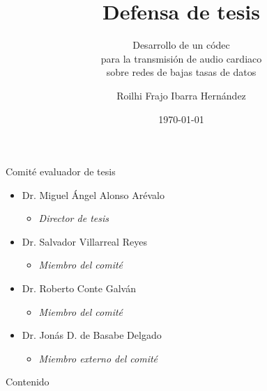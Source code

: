 \documentclass[xcolor=table]{beamer}
\title{Defensa de tesis}
\subtitle{Desarrollo de un c\'{o}dec \\para la transmisi\'{o}n de audio cardiaco\\ sobre redes de bajas tasas de datos}
\date{\today}
\author{Roilhi Frajo Ibarra Hern\'{a}ndez}
\institute{Departamento de Electr\'{o}nica y Telecomunicaciones\\Divisi\'{o}n de F\'{i}sica Aplicada}
\begin{document}

\beamertemplatenavigationsymbolsempty
\begin{frame}[plain]
	\titlepage
\end{frame}
\begin{frame}{Comit\'e evaluador de tesis}
\begin{itemize}
	\item Dr. Miguel \'Angel Alonso Ar\'evalo
		\begin{itemize}
			\item \emph{Director de tesis}
		\end{itemize}
	\item Dr. Salvador Villarreal Reyes
		\begin{itemize}
			\item \emph{Miembro del comit\'e}
		\end{itemize}	
	\item Dr. Roberto Conte Galv\'an
		\begin{itemize}
			\item \emph{Miembro del comit\'e}
		\end{itemize}
	\item Dr. Jon\'as D. de Basabe Delgado
		\begin{itemize}
			\item \emph{Miembro externo del comit\'e}
		\end{itemize}
\end{itemize}
\end{frame}


\begin{frame}{Contenido}
	\tableofcontents[hideallsubsections]
\end{frame}
\end{document}
